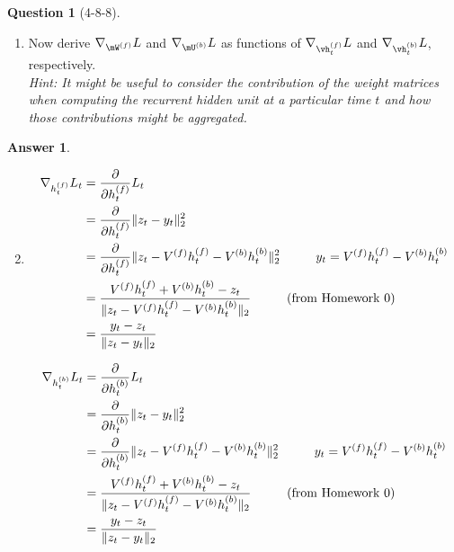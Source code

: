 \documentclass[12pt]{article}
\theoremstyle{definition}
\newtheorem{exercise}{Question}%
\newtheorem{answer}{Answer} %
\newcommand{\Answer}[1]{
\begin{answer}#1\end{answer}
}
\newcommand\tab[1][1cm]{\hspace*{#1}}
\newcommand{\pd}[2]{\frac{\partial#1}{\partial#2}}
\newcommand{\norm}[1]{\|#1\|}
\begin{document}
\begin{exercise}[4-8-8]
{\begin{enumerate}
Derive an expression for $\nabla_{\vh_{t}^{(f)}}L_t$, $\nabla_{\vh_{t}^{(b)}}L_t$, $\frac{\partial \vh_{t+1}^{(f)}}{\partial \vh_{t}^{(f)}}$ and $\frac{\partial \vh_{t-1}^{(b)}}{\partial \vh_{t}^{(b)}}$.


\item
Now derive $\nabla_{\mW^{(f)}}L$ and $\nabla_{\mU^{(b)}}L$ as functions of $\nabla_{\vh_{t}^{(f)}}L$ and $\nabla_{\vh_{t}^{(b)}}L$, respectively.\\
\emph{Hint: It might be useful to consider the contribution of the weight matrices when computing the recurrent hidden unit at a particular time $t$ and how those contributions might be aggregated.}

\end{enumerate}
}

\newcommand{\expr}[3]{#1_{#2}^{(#3)}}

\Answer{
\begin{enumerate}
    \setcounter{enumi}{1}
    \item {
    \begin{alignat*}{3}
    \nabla_{h_t^{(f)}}L_t &= \pd{}{h_t^{(f)}} L_t
    \\
    &= \pd{}{h_t^{(f)}} \norm{z_t - y_t}_2^2
    \\
    &= \pd{}{h_t^{(f)}} \norm{z_t - V^{(f)}\expr{h}{t}{f} - V^{(b)}\expr{h}{t}{b}}_2^2 \tab y_t = V^{(f)}\expr{h}{t}{f} - V^{(b)}\expr{h}{t}{b}
    \\
    &= \frac{\expr{V}{}{f}\expr{h}{t}{f} + \expr{V}{}{b}\expr{h}{t}{b} - z_t}{\norm{z_t - V^{(f)}\expr{h}{t}{f} - V^{(b)}\expr{h}{t}{b}}_2} \tab \text{(from Homework 0)}
    \\
    &= \frac{y_t - z_t}{\norm{z_t - y_t}_2}
    \end{alignat*}
    
    \begin{alignat*}{3}
    \nabla_{h_t^{(b)}}L_t &= \pd{}{h_t^{(b)}} L_t
    \\
    &= \pd{}{h_t^{(b)}} \norm{z_t - y_t}_2^2
    \\
    &= \pd{}{h_t^{(b)}} \norm{z_t - V^{(f)}\expr{h}{t}{f} - V^{(b)}\expr{h}{t}{b}}_2^2 \tab y_t = V^{(f)}\expr{h}{t}{f} - V^{(b)}\expr{h}{t}{b}
    \\
    &= \frac{\expr{V}{}{f}\expr{h}{t}{f} + \expr{V}{}{b}\expr{h}{t}{b} - z_t}{\norm{z_t - V^{(f)}\expr{h}{t}{f} - V^{(b)}\expr{h}{t}{b}}_2} \tab \text{(from Homework 0)}
    \\
    &= \frac{y_t - z_t}{\norm{z_t - y_t}_2}
    \end{alignat*}
    
}
\end{enumerate}}
\end{exercise}
\end{document}
